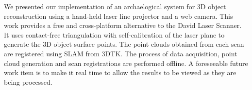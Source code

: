 We presented our implementation of an archaelogical system for 3D object
reconstruction using a hand-held laser line projector and a web camera.  This
work provides a free and cross-platform alternative to the David Laser
Scanner. It uses contact-free triangulation with self-calibration of the laser
plane to generate the 3D object surface points. The point clouds obtained from
each scan are registered using \ac{SLAM} from \ac{3DTK}. The process of data
acquisition, point cloud generation and scan registrations are performed
offline. A foreseeable future work item is to make it real time to allow the
results to be viewed as they are being processed.
